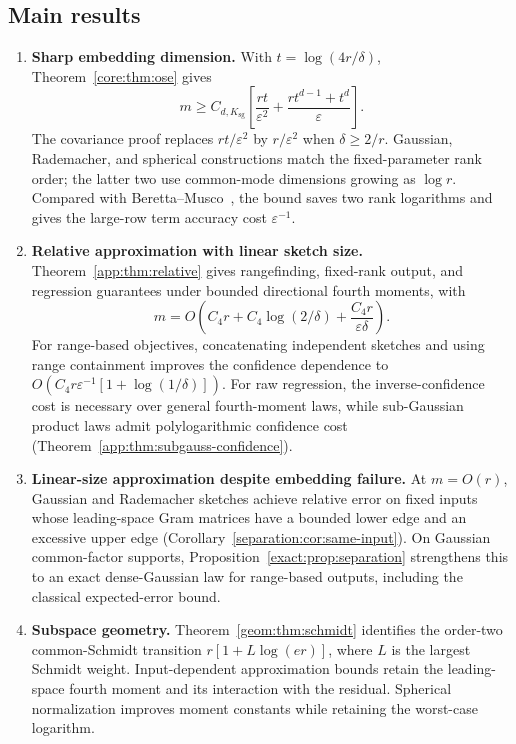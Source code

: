 \documentclass[11pt,a4paper]{article}
\theoremstyle{definition}\newtheorem{definition}[theorem]{Definition}
\theoremstyle{remark}\newtheorem{remark}[theorem]{Remark}
\numberwithin{equation}{section}
\newcommand{\Ksg}{{K_{\mathrm{sg}}}}\newcommand{\Cfour}{{C_4}}
\begin{document}
\subsection{Main results}
\begin{enumerate}
\item \textbf{Sharp embedding dimension.}
With $t=\log(4r/\delta)$, Theorem~\ref{core:thm:ose} gives
\begin{equation}\label{eq:intro:sharp}
 m\ge C_{d,\Ksg}\left[\frac{rt}{\varepsilon^2}
             +\frac{rt^{d-1}+t^d}{\varepsilon}\right].
\end{equation}
The covariance proof replaces $rt/\varepsilon^2$ by
$r/\varepsilon^2$ when $\delta\ge2/r$.
Gaussian, Rademacher, and spherical constructions match the fixed-parameter
rank order; the latter two use common-mode dimensions growing as $\log r$.
Compared with Beretta--Musco~\cite[Theorem~1.3]{BM2026}, the bound saves
two rank logarithms and gives the large-row term accuracy cost
$\varepsilon^{-1}$.

\item \textbf{Relative approximation with linear sketch size.}
Theorem~\ref{app:thm:relative} gives rangefinding, fixed-rank output,
and regression guarantees under bounded directional fourth moments, with
\begin{equation}\label{eq:intro:relative}
 m=O\!\left(\Cfour r+\Cfour\log(2/\delta)
                    +\frac{\Cfour r}{\varepsilon\delta}\right).
\end{equation}
For range-based objectives, concatenating independent sketches and
using range containment improves the confidence dependence to
$O(\Cfour r\varepsilon^{-1}[1+\log(1/\delta)])$.
For raw regression, the inverse-confidence cost is necessary over
general fourth-moment laws, while sub-Gaussian product laws admit
polylogarithmic confidence cost
(Theorem~\ref{app:thm:subgauss-confidence}).

\item \textbf{Linear-size approximation despite embedding failure.}
At $m=O(r)$, Gaussian and Rademacher sketches achieve relative error
on fixed inputs whose leading-space Gram matrices have a bounded
lower edge and an excessive upper edge
(Corollary~\ref{separation:cor:same-input}). On Gaussian common-factor
supports, Proposition~\ref{exact:prop:separation} strengthens this to an
exact dense-Gaussian law for range-based outputs, including the classical
expected-error bound.

\item \textbf{Subspace geometry.}
Theorem~\ref{geom:thm:schmidt} identifies the order-two common-Schmidt
transition $r[1+L\log(er)]$, where $L$ is the largest Schmidt weight.
Input-dependent approximation bounds retain the leading-space fourth
moment and its interaction with the residual. Spherical normalization
improves moment constants while retaining the worst-case logarithm.
\end{enumerate}
\end{document}
